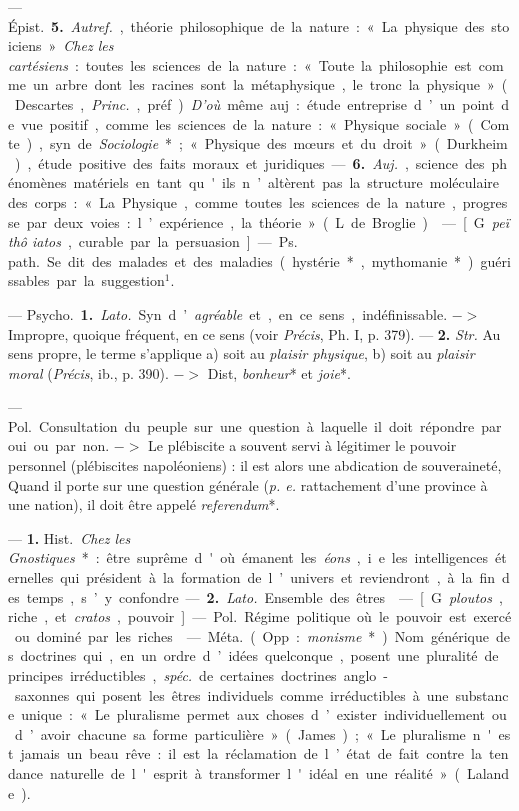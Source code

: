 \begin{itemize}[leftmargin=1cm, label=, itemsep=1pt]
 — \si{Épist.} {\bf 5.} {\it Autref.}, théorie
philosophique de la nature : « La physique des stoiciens ». {\it Chez les
cartésiens} : toutes les sciences de la nature : « Toute la philosophie est
comme un arbre dont les racines sont la métaphysique, le tronc la physique
» (Descartes, {\it Princ.}, préf.). {\it D'où} même auj. : étude entreprise
d’un point de vue positif, comme les sciences de la nature : « Physique
sociale » (Comte), syn. de {\it Sociologie}* ; « Physique des mœurs et du
droit » (Durkheim), étude positive des faits moraux et juridiques. — {\bf 6.}
{\it Auj.}, science des phénomènes matériels en tant qu'ils n’altèrent pas la
structure moléculaire des corps : « La Physique, comme toutes les sciences de
la nature, progresse par deux voies : l’expérience, la théorie » (L. de
Broglie).

 — [G. {\it peïthô iatos}, curable par la persuasion] —
\si{Ps. path.} Se dit des malades et des maladies (hystérie*, mythomanie*)
guérissables par la suggestion$^1$.

 — \si{Psycho.} {\bf 1.} {\it Lato.} Syn. d’{\it agréable} et, en
ce sens, indéfinissable. $->$ Impropre, quoique fréquent, en ce sens (voir
{\it Précis}, Ph. I, p. 379). — {\bf 2.} {\it Str.} Au sens propre, le terme
s'applique {\it }a) soit au {\it plaisir physique}, {\it }b) soit au {\it
plaisir moral} ({\it Précis}, ib., p. 390). $->$ Dist, {\it bonheur}* et {\it
joie}*.

 — \si{Pol.} Consultation du peuple sur une question à
laquelle il doit répondre par oui ou par non. $->$ Le plébiscite a souvent
servi à légitimer le pouvoir personnel (plébiscites napoléoniens) : il est
alors une abdication de souveraineté, Quand il porte sur une question
générale ({\it p. e.} rattachement d'une province à une nation), il doit être
appelé {\it referendum}*.

 — {\bf 1.} \si{Hist.} {\it Chez les Gnostiques}* : être suprême
d'où émanent les {\it éons}, i.e. les intelligences éternelles qui président
à la formation de l’univers et reviendront, à la fin des temps, s’y
confondre. — {\bf 2.} {\it Lato.} Ensemble des êtres.

 — [G. {\it ploutos}, riche, et {\it cratos}, pouvoir] —
\si{Pol.} Régime politique où le pouvoir est exercé ou dominé par les riches.

 — \si{Méta.} (Opp. : {\it monisme}*). Nom générique des
doctrines qui, en un ordre d’idées quelconque, posent une pluralité de
principes irréductibles, {\it spéc.} de certaines doctrines anglo-saxonnes
qui posent les êtres individuels comme irréductibles à une substance unique :
« Le pluralisme permet aux choses d’exister individuellement ou d’avoir
chacune sa forme particulière » (James) ; « Le pluralisme n'est jamais un
beau rêve : il est la réclamation de l’état de fait contre la tendance
naturelle de l'esprit à transformer l'idéal en une réalité » (Lalande).


\end{itemize}
